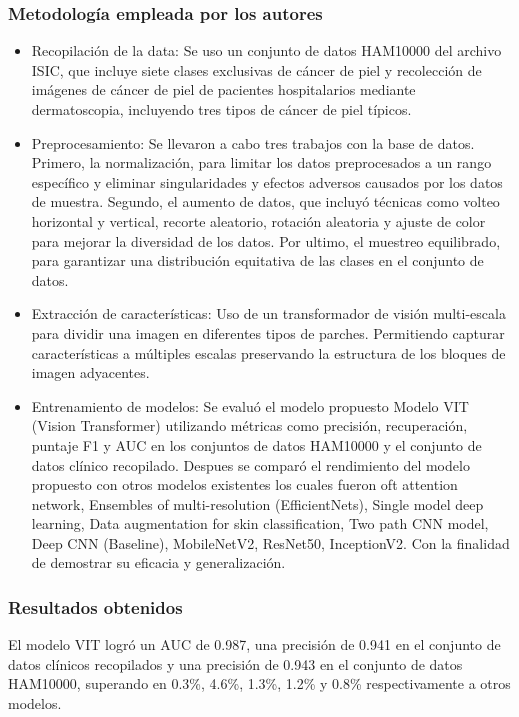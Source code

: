 \subsubsection{Metodología empleada por los autores}
\newcommand{\TPACone}{Recopilación de la data: Se uso un conjunto de datos HAM10000 del archivo ISIC, que incluye siete clases exclusivas de cáncer de piel y recolección de imágenes de cáncer de piel de pacientes hospitalarios mediante dermatoscopia, incluyendo tres tipos de cáncer de piel típicos.	
}

\newcommand{\TPACtwo}{Preprocesamiento: Se llevaron a cabo tres trabajos con la base de datos. Primero, la normalización, para limitar los datos preprocesados a un rango específico y eliminar singularidades y efectos adversos causados por los datos de muestra. Segundo, el aumento de datos, que incluyó técnicas como volteo horizontal y vertical, recorte aleatorio, rotación aleatoria y ajuste de color para mejorar la diversidad de los datos. Por ultimo, el muestreo equilibrado, para garantizar una distribución equitativa de las clases en el conjunto de datos. }

\newcommand{\TPACthree}{Extracción de características: Uso de un transformador de visión multi-escala para dividir una imagen en diferentes tipos de parches. Permitiendo capturar características a múltiples escalas preservando la estructura de los bloques de imagen adyacentes.
}


\newcommand{\TPACfour}{ Entrenamiento de modelos: Se evaluó el modelo propuesto Modelo VIT (Vision Transformer) utilizando métricas como precisión, recuperación, puntaje F1 y AUC en los conjuntos de datos HAM10000 y el conjunto de datos clínico recopilado.
Despues se comparó el rendimiento del modelo propuesto con otros modelos existentes los cuales fueron oft attention network, Ensembles of multi-resolution (EfficientNets), Single model deep learning, Data augmentation for skin classification, Two path CNN model, Deep CNN (Baseline), MobileNetV2, ResNet50, InceptionV2. Con la finalidad de demostrar su eficacia y generalización.	
}

\begin{itemize}
	\item \TPACone
	\item \TPACtwo
	\item \TPACthree
	\item \TPACfour
	
\end{itemize}


\subsubsection{Resultados obtenidos}
El modelo VIT logró un AUC de 0.987, una precisión de 0.941 en el conjunto de datos clínicos recopilados y una precisión de 0.943 en el conjunto de datos HAM10000, superando en 0.3\%, 4.6\%, 1.3\%, 1.2\% y 0.8\% respectivamente a otros modelos.

